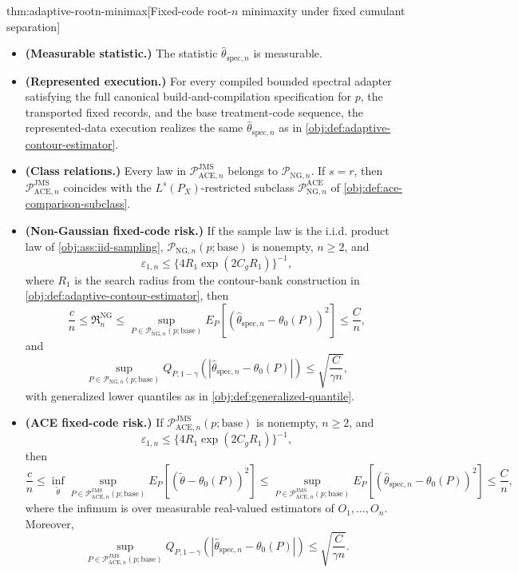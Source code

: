 \begin{theoremv}{thm:adaptive-rootn-minimax}[Fixed-code root-\(n\) minimaxity under fixed cumulant separation]
\begin{itemize}
\item \textbf{(Measurable statistic.)}  The statistic \(\widehat\theta_{\mathrm{spec},n}\) is measurable.
\item \textbf{(Represented execution.)}  For every compiled bounded spectral adapter satisfying the full canonical build-and-compilation specification for \(p\), the transported fixed records, and the base treatment-code sequence, the represented-data execution realizes the same \(\widehat\theta_{\mathrm{spec},n}\) as in \cref{obj:def:adaptive-contour-estimator}.
\item \textbf{(Class relations.)}  Every law in \(\mathcal P_{\mathrm{ACE},n}^{\mathrm{JMS}}\) belongs to \(\mathcal P_{\mathrm{NG},n}\).  If \(s=r\), then \(\mathcal P_{\mathrm{ACE},n}^{\mathrm{JMS}}\) coincides with the \(L^s(P_X)\)-restricted subclass \(\mathcal P_{\mathrm{NG},n}^{\mathrm{ACE}}\) of \cref{obj:def:ace-comparison-subclass}.
\item \textbf{(Non-Gaussian fixed-code risk.)}  If the sample law is the i.i.d. product law of \cref{obj:ass:iid-sampling}, \(\mathcal P_{\mathrm{NG},n}(p;\mathrm{base})\) is nonempty, \(n\ge 2\), and
\[
\varepsilon_{1,n}\le \{4R_1\exp(2C_gR_1)\}^{-1},
\]
where \(R_1\) is the search radius from the contour-bank construction in \cref{obj:def:adaptive-contour-estimator}, then
\[
\frac{c}{n}
\le
\mathfrak R_n^{\mathrm{NG}}
\le
\sup_{P\in\mathcal P_{\mathrm{NG},n}(p;\mathrm{base})}
E_P\!\left[(\widehat\theta_{\mathrm{spec},n}-\theta_0(P))^2\right]
\le
\frac{C}{n},
\]
and
\[
\sup_{P\in\mathcal P_{\mathrm{NG},n}(p;\mathrm{base})}
Q_{P,1-\gamma}\!\left(|\widehat\theta_{\mathrm{spec},n}-\theta_0(P)|\right)
\le
\sqrt{\frac{C}{\gamma n}},
\]
with generalized lower quantiles as in \cref{obj:def:generalized-quantile}.
\item \textbf{(ACE fixed-code risk.)}  If \(\mathcal P_{\mathrm{ACE},n}^{\mathrm{JMS}}(p;\mathrm{base})\) is nonempty, \(n\ge 2\), and
\[
\varepsilon_{1,n}\le \{4R_1\exp(2C_gR_1)\}^{-1},
\]
then
\[
\frac{c}{n}
\le
\inf_{\widetilde\theta}
\sup_{P\in\mathcal P_{\mathrm{ACE},n}^{\mathrm{JMS}}(p;\mathrm{base})}
E_P\!\left[(\widetilde\theta-\theta_0(P))^2\right]
\le
\sup_{P\in\mathcal P_{\mathrm{ACE},n}^{\mathrm{JMS}}(p;\mathrm{base})}
E_P\!\left[(\widehat\theta_{\mathrm{spec},n}-\theta_0(P))^2\right]
\le
\frac{C}{n},
\]
where the infimum is over measurable real-valued estimators of \(O_1,\ldots,O_n\).  Moreover,
\[
\sup_{P\in\mathcal P_{\mathrm{ACE},n}^{\mathrm{JMS}}(p;\mathrm{base})}
Q_{P,1-\gamma}\!\left(|\widehat\theta_{\mathrm{spec},n}-\theta_0(P)|\right)
\le
\sqrt{\frac{C}{\gamma n}}.
\]
\end{itemize}
\end{theoremv}

